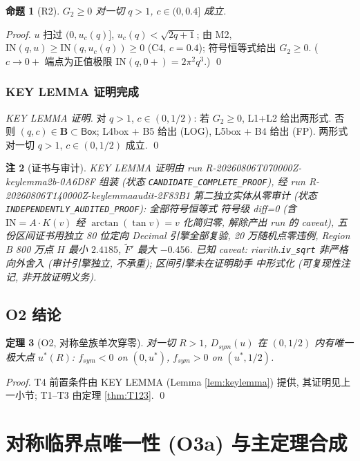 \documentclass[UTF8]{ctexart}
\newtheorem{theorem}{定理}[section]
\newtheorem{proposition}[theorem]{命题}
\newtheorem{remark}[theorem]{注}
\begin{document}
\begin{proposition}[R2]
$G_2\ge0$ 对一切 $q>1$, $c\in(0,0.4]$ 成立.
\end{proposition}
\begin{proof}
$u$ 扫过 $(0,u_c(q)]$, $u_c(q)<\sqrt{2q+1}$; 由 M2, $\mathrm{IN}(q,u)\ge
\mathrm{IN}(q,u_c(q))\ge0$ (C4, $c=0.4$); 符号恒等式给出 $G_2\ge0$.
($c\to0+$ 端点为正值极限 $\mathrm{IN}(q,0+)=2\pi^2q^3$.) \qed
\end{proof}

\subsubsection{KEY LEMMA 证明完成}
\begin{proof}[KEY LEMMA 证明]
对 $q>1$, $c\in(0,1/2)$: 若 $G_2\ge0$, L1+L2 给出两形式. 否则
$(q,c)\in\mathbf B\subset\mathsf{Box}$; L4box + B5 给出 (LOG), L5box + B4 给出 (FP).
两形式对一切 $q>1$, $c\in(0,1/2)$ 成立. \qed
\end{proof}

\begin{remark}[证书与审计]
KEY LEMMA 证明由 run R-20260806T070000Z-keylemma2b-0A6D8F 组装 (状态
\texttt{CANDIDATE\_COMPLETE\_PROOF}), 经 run R-20260806T140000Z-keylemmaaudit-2F83B1
第二独立实体从零审计 (状态 \texttt{INDEPENDENTLY\_AUDITED\_PROOF}): 全部符号恒等式
符号级 diff=0 (含 $\mathrm{IN}=A\cdot K(v)$ 经 $\arctan(\tan v)=v$ 化简归零, 解除产出
run 的 caveat), 五份区间证书用独立 80 位定向 Decimal 引擎全部复验, 20 万随机点零违例,
Region B 800 万点 $H$ 最小 $2.4185$, $\widetilde F'$ 最大 $-0.456$. 已知 caveat:
riarith.\texttt{iv\_sqrt} 非严格向外舍入 (审计引擎独立, 不承重); 区间引擎未在证明助手
中形式化 (可复现性注记, 非开放证明义务).
\end{remark}

\subsection{O2 结论}
\begin{theorem}[O2, 对称垒族单次穿零]
对一切 $R>1$, $D_{sym}(u)$ 在 $(0,1/2)$ 内有唯一极大点 $u^*(R)$:
$f_{sym}<0$ on $(0,u^*)$, $f_{sym}>0$ on $(u^*,1/2)$.
\end{theorem}
\begin{proof}
T4 前置条件由 KEY LEMMA (Lemma \ref{lem:keylemma}) 提供, 其证明见上一小节; T1--T3
由定理 \ref{thm:T123}. \qed
\end{proof}

\section{对称临界点唯一性 (O3a) 与主定理合成}
\end{document}
